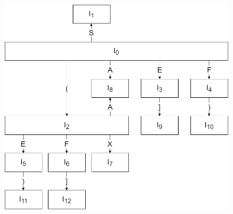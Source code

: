 \documentclass[a4paper,10pt]{jsarticle}
\begin{document}
\begin{figure}[H]
  \centering
  \includegraphics[width=10cm]{./01.png}
\end{figure}
\end{document}
